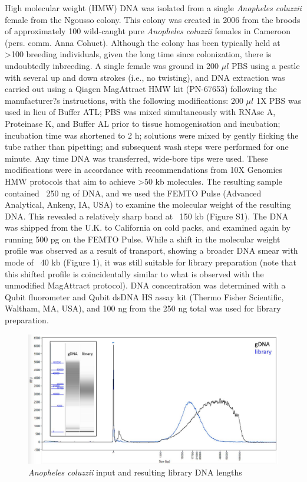 High molecular weight (HMW) DNA was isolated from a single \textit{Anopheles coluzzii} female from the Ngousso colony. This colony was created in 2006 from the broods of approximately 100 wild-caught pure \textit{Anopheles coluzzii} females in Cameroon (pers. comm. Anna Cohuet). Although the colony has been typically held at >100 breeding individuals, given the long time since colonization, there is undoubtedly inbreeding. A single female was ground in 200 $\mu l$ PBS using a pestle with several up and down strokes (i.e., no twisting), and DNA extraction was carried out using a Qiagen MagAttract HMW kit (PN-67653) following the manufacturer?s instructions, with the following modifications: 200 $\mu l$ 1X PBS was used in lieu of Buffer ATL; PBS was mixed simultaneously with RNAse A, Proteinase K, and Buffer AL prior to tissue homogenisation and incubation; incubation time was shortened to 2 h; solutions were mixed by gently flicking the tube rather than pipetting; and subsequent wash steps were performed for one minute. Any time DNA was transferred, wide-bore tips were used. These modifications were in accordance with recommendations from 10X Genomics HMW protocols that aim to achieve >50 kb molecules. The resulting sample contained ~250 ng of DNA, and we used the FEMTO Pulse (Advanced Analytical, Ankeny, IA, USA) to examine the molecular weight of the resulting DNA. This revealed a relatively sharp band at ~150 kb (Figure S1). The DNA was shipped from the U.K. to California on cold packs, and examined again by running 500 pg on the FEMTO Pulse. While a shift in the molecular weight profile was observed as a result of transport, showing a broader DNA smear with mode of ~40 kb (Figure 1), it was still suitable for library preparation (note that this shifted profile is coincidentally similar to what is observed with the unmodified MagAttract protocol). DNA concentration was determined with a Qubit fluorometer and Qubit dsDNA HS assay kit (Thermo Fisher Scientific, Waltham, MA, USA), and 100 ng from the 250 ng total was used for library preparation.



\begin{figure}[!ht]
\caption{\textit{Anopheles coluzzii} input and resulting library DNA lengths}
\label{figure:fempto}
\begin{centering}
\includegraphics[width=.60\textwidth]{fempto.png}
\end{centering}
\end{figure}

